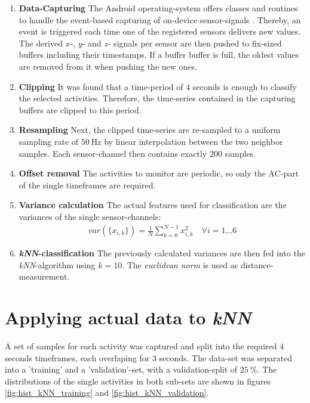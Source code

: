 \documentclass[journal]{IEEEtran}
\begin{document}
\begin{enumerate}
    \item \textbf{Data-Capturing}\newline
        The Android operating-system offers classes and routines to handle the
        event-based capturing of on-device sensor-signals 
        \cite{noauthor_sensoreventcallback_2021}. Thereby, an event is
        triggered each time one of the registered sensors delivers new values.
        The derived $x$-, $y$- and $z$- signals per sensor are then
        pushed to fix-sized buffers including their timestamps. 
        If a buffer buffer is full, the oldest values are removed from it when 
        pushing the new ones.
    \item \textbf{Clipping}\newline
        It was found that a time-period of $4$ seconds is enough
        to classify the selected activities. Therefore, the time-series 
        contained in the capturing buffers are clipped to this period.
    \item \textbf{Resampling}\newline
        Next, the clipped time-series are re-sampled to a uniform sampling rate
        of $50\ \si{\hertz}$ by linear interpolation between the two
        neighbor samples. Each sensor-channel then contains exactly $200$
        samples.
    \item \textbf{Offset removal}\newline
        The activities to monitor are periodic, so only the AC-part of the
        single timeframes are required.
    \item \textbf{Variance calculation}\newline
        The actual features used for classification are the variances of the
        single sensor-channels:
        \begin{align}
            \mathit{var}\left(\{x_{i,k}\}\right) = \frac{1}{N} \sum\limits_{k=0}^{N-1} x_{i,k}^2 \quad \forall i = 1 ... 6
        \end{align}
    \item \textbf{\textit{kNN}-classification}\newline
        The previously calculated variances are then fed into the
        \textit{kNN}-algorithm using $k=10$. The \textit{euclidean norm} is used
        as distance-measurement.
\end{enumerate}

\section{Applying actual data to \textit{kNN}} 
A set of samples for each activity was captured and split into the required 
$4$ seconds timeframes, each overlaping for $3$ seconds. 
The data-set was separated into a 'training' and a 'validation'-set, 
with a validation-split of $25\ \si{\percent}$. 
The distributions of the single activities in both sub-sets are shown in
figures  \ref{fig:hist_kNN_training} and \ref{fig:hist_kNN_validation}.
\end{document}

